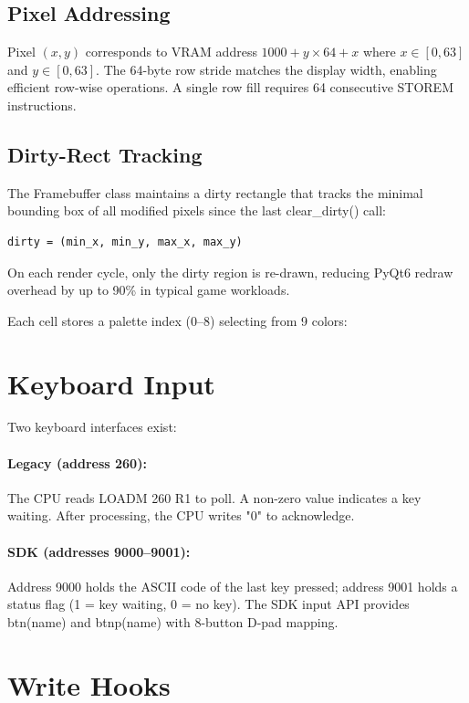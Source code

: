 \documentclass[12pt,a4paper,twoside]{book}
\theoremstyle{trinarytheorem}
\theoremstyle{trinarydefinition}
\newcommand{\code}[1]{\textsf{#1}}
\begin{document}
\subsection{Pixel Addressing}

Pixel $(x, y)$ corresponds to VRAM address $1000 + y \times 64 + x$ where
$x \in [0, 63]$ and $y \in [0, 63]$. The 64-byte row stride matches the display
width, enabling efficient row-wise operations. A single row fill requires 64
consecutive STOREM instructions.

\subsection{Dirty-Rect Tracking}

The \code{Framebuffer} class maintains a dirty rectangle that tracks the
minimal bounding box of all modified pixels since the last \code{clear\_dirty()}
call:
\begin{verbatim}
dirty = (min_x, min_y, max_x, max_y)
\end{verbatim}
On each render cycle, only the dirty region is re-drawn, reducing PyQt6 redraw
overhead by up to 90\% in typical game workloads.

Each cell stores a palette index (0--8) selecting from 9 colors:

\section{Keyboard Input}

Two keyboard interfaces exist:

\paragraph{Legacy (address 260):} The CPU reads \code{LOADM 260 R1} to poll. A
non-zero value indicates a key waiting. After processing, the CPU writes \code{"0"}
to acknowledge.

\paragraph{SDK (addresses 9000--9001):} Address 9000 holds the ASCII code of the last
key pressed; address 9001 holds a status flag (1 = key waiting, 0 = no key). The SDK
input API provides \code{btn(name)} and \code{btnp(name)} with 8-button D-pad
mapping.

\section{Write Hooks}
\end{document}
